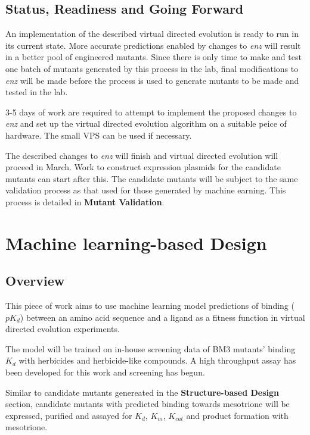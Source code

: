 \documentclass{article}
\begin{document}
\subsection{Status, Readiness and Going Forward}
An implementation of the described virtual directed evolution is ready to run in its current state. More accurate predictions enabled by changes to \textit{enz} will result in a better pool of engineered mutants. %
Since there is only time to make and test one batch of mutants generated by this process in the lab, final modifications to \textit{enz} will be made before the process is used to generate mutants to be made and tested in the lab. %
\par
3-5 days of work are required to attempt to implement the proposed changes to \textit{enz} and set up the virtual directed evolution algorithm on a suitable peice of hardware. The small VPS can be used if necessary. %
\par
The described changes to \textit{enz} will finish and virtual directed evolution will proceed in March. Work to construct expression plasmids for the candidate mutants can start after this. %
The candidate mutants will be subject to the same validation process as that used for those generated by machine earning. This process is detailed in \textbf{Mutant Validation}. %

\section{Machine learning-based Design}
\subsection{Overview}
This piece of work aims to use machine learning model predictions of binding ($pK_d$) between an amino acid sequence and a ligand as a fitness function in virtual directed evolution experiments. %
\par
The model will be trained on in-house screening data of BM3 mutants' binding $K_d$ with herbicides and herbicide-like compounds. A high throughput assay has been developed for this work and screening has begun. %
\par
Similar to candidate mutants genereated in the \textbf{Structure-based Design} section, candidate mutants with predicted binding towards mesotrione will be expressed, purified and assayed for $K_d$, $K_m$, $K_{cat}$ and product formation with mesotrione. %
\par
\end{document}
